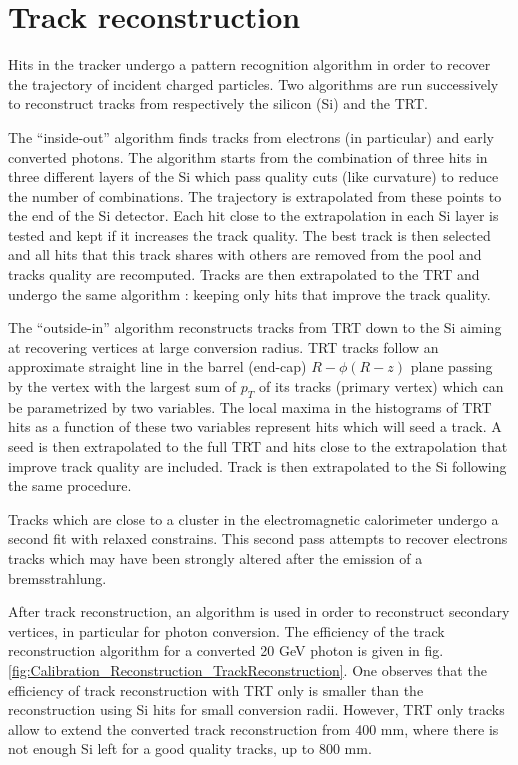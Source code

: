 \section{Track reconstruction}
\label{sec:org31b9eab}
Hits in the tracker undergo a pattern recognition algorithm in order to recover the trajectory of incident charged particles.
Two algorithms are run successively \cite{1742-6596-119-3-032014} to reconstruct tracks from respectively the silicon (Si) and the TRT.

The ``inside-out'' algorithm finds tracks from electrons (in particular) and early converted photons.
The algorithm starts from the combination of three hits in three different layers of the Si which pass quality cuts (like curvature) to reduce the number of combinations.
The trajectory is extrapolated from these points to the end of the Si detector.
Each hit close to the extrapolation in each Si layer is tested and kept if it increases the track quality.
The best track is then selected and all hits that this track shares with others are removed from the pool and tracks quality are recomputed.
Tracks are then extrapolated to the TRT and undergo the same algorithm : keeping only hits that improve the track quality.

The ``outside-in'' algorithm reconstructs tracks from TRT down to the Si aiming at recovering vertices at large conversion radius.
TRT tracks follow an approximate straight line in the barrel (end-cap) \(R-\phi (R-z)\) plane passing by the vertex with the largest sum of $p_T$ of its tracks (primary vertex) which can be parametrized by two variables.
The local maxima in the histograms of TRT hits as a function of these two variables represent hits which will seed a track.
A seed is then extrapolated to the full TRT and hits close to the extrapolation that improve track quality are included.
Track is then extrapolated to the Si following the same procedure.

Tracks which are close to a cluster in the electromagnetic calorimeter undergo a second fit with relaxed constrains.
This second pass attempts to recover electrons tracks which may have been strongly altered after the emission of a bremsstrahlung.

After track reconstruction, an algorithm is used in order to reconstruct secondary vertices, in particular for photon conversion.
The efficiency of the track reconstruction algorithm for a converted 20 GeV photon is given in fig. \ref{fig:Calibration_Reconstruction_TrackReconstruction}.
One observes that the efficiency of track reconstruction with TRT only is smaller than the reconstruction using Si hits for small conversion radii.
However, TRT only tracks allow to extend the converted track reconstruction from 400 mm, where there is not enough Si left for a good quality tracks, up to 800 mm.

